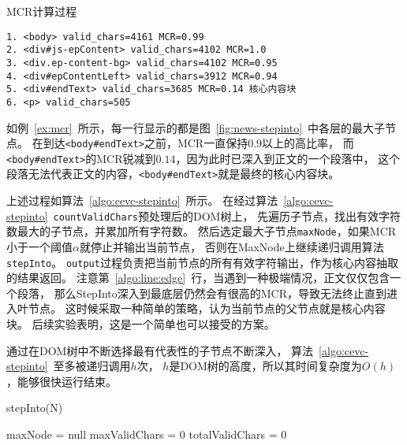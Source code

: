 \begin{example}
\label{ex:mcr}
MCR计算过程
\end{example}
\begin{oframed}
\begin{verbatim}
1. <body> valid_chars=4161 MCR=0.99
2. <div#js-epContent> valid_chars=4102 MCR=1.0
3. <div.ep-content-bg> valid_chars=4102 MCR=0.95
4. <div#epContentLeft> valid_chars=3912 MCR=0.94
5. <div#endText> valid_chars=3685 MCR=0.14 核心内容块
6. <p> valid_chars=505
\end{verbatim}
\end{oframed}

如例~\ref{ex:mcr}~所示，每一行显示的都是图~\ref{fig:news-stepinto}~中各层的最大子节点。
在到达\texttt{<body\#endText>}之前，MCR一直保持$0.9$以上的高比率，
而\texttt{<body\#endText>}的MCR锐减到$0.14$，因为此时已深入到正文的一个段落中，
这个段落无法代表正文的内容，\texttt{<body\#endText>}就是最终的核心内容块。

上述过程如算法~\ref{algo:cevc-stepinto}~所示。
在经过算法~\ref{algo:cevc-stepinto}~\texttt{countValidChars}预处理后的DOM树上，
先遍历子节点，找出有效字符数最大的子节点，并累加所有字符数。
然后选定最大子节点\texttt{maxNode}，如果MCR小于一个阈值$\alpha$就停止并输出当前节点，
否则在MaxNode上继续递归调用算法\texttt{stepInto}。
\texttt{output}过程负责把当前节点的所有有效字符输出，作为核心内容抽取的结果返回。
注意第~\ref{algo:line:edge}~行，当遇到一种极端情况，正文仅仅包含一个段落，
那么StepInto深入到最底层仍然会有很高的MCR，导致无法终止直到进入叶节点。
这时候采取一种简单的策略，认为当前节点的父节点就是核心内容块。
后续实验表明，这是一个简单也可以接受的方案。

通过在DOM树中不断选择最有代表性的子节点不断深入，
算法~\ref{algo:cevc-stepinto}~至多被递归调用$h$次，
$h$是DOM树的高度，所以其时间复杂度为$O(h)$，能够很快运行结束。

\begin{algorithm}[htbp]
\caption{stepInto(N)}
\label{algo:cevc-stepinto}

maxNode = null \;
maxValidChars = 0 \;
totalValidChars = 0 \;

\end{algorithm}

